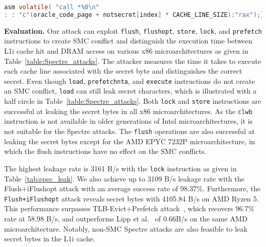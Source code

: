 \begin{lstlisting}[language=C, caption={C Code snippet for the victim function executing an indirect branch instruction}, label=lst:conditional_assembly,basicstyle=\ttfamily\scriptsize, basewidth={.48em}, backgroundcolor=\color{white}]
asm volatile( "call *%0\n" 
: : "c"(oracle_code_page + notsecret[index] * CACHE_LINE_SIZE):"rax");}
\end{lstlisting}

\noindent\textbf{Evaluation.} 
Our attack can exploit \texttt{flush}, \texttt{flushopt}, \texttt{store}, \texttt{lock}, and \texttt{prefetch} instructions to create SMC conflict and distinguish the execution time between L1i cache hit and DRAM access on various x86 microarchitectures as given in Table~\ref{table:Spectre_attacks}. 
The attacker measures the time it takes to execute each cache line associated with the secret byte and distinguishes the correct secret.
Even though \texttt{load}, \texttt{prefetchnta}, and \texttt{execute} instructions do not create an SMC conflict, \texttt{load} can still leak secret characters, which is illustrated with a half circle in Table~\ref{table:Spectre_attacks}. 
Both \texttt{lock} and \texttt{store} instructions are successful at leaking the secret bytes in all x86 microarchitectures. 
As the \texttt{clwb} instruction is not available in older generations of Intel microarchitectures, it is not suitable for the Spectre attacks. 
The \texttt{flush} operations are also successful at leaking the secret bytes except for the AMD EPYC 7232P microarchitecture, in which the flush instructions have no effect on the SMC conflicts.

The highest leakage rate is 3161 B/s with the \texttt{lock} instruction as given in Table~\ref{tab:spec_leak}. We also achieve up to 3109 B/s leakage rate with the Flush+iFlushopt attack with an average success rate of 98.37\%. Furthermore, the \texttt{Flush+iFlushopt} attack reveals secret bytes with 4105.84 B/s on AMD Ryzen 5. This performance surpasses TLB-Evict+Prefetch attack~\cite{lipp2022amd}, which recovers 96.7\% rate at 58.98 B/s, and outperforms Lipp et al.~\cite{lipp2020take} of 0.66B/s on the same AMD microarchitecture.
Notably, non-SMC Spectre attacks are also feasible to leak secret bytes in the L1i cache. 

\begin{table}[h]
\small
\centering
\caption{Spectre-v1 leakage rates for Flush+iReload attacks. The leakage rates are given in B/s. The experiments are conducted on Intel Cascade Lake and AMD Ryzen 5 processors.}
\setlength{\tabcolsep}{5pt}
\label{tab:spec_leak}

\end{table}
